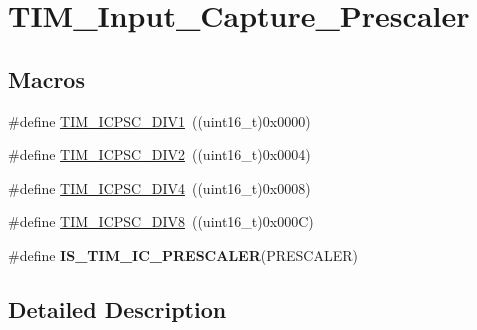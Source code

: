 \hypertarget{group___t_i_m___input___capture___prescaler}{\section{T\-I\-M\-\_\-\-Input\-\_\-\-Capture\-\_\-\-Prescaler}
\label{group___t_i_m___input___capture___prescaler}
}
\subsection*{Macros}
\begin{DoxyCompactItemize}
\item 
\#define \hyperlink{group___t_i_m___input___capture___prescaler_ga8acb44abe3147d883685c1f9f1ce410e}{T\-I\-M\-\_\-\-I\-C\-P\-S\-C\-\_\-\-D\-I\-V1}~((uint16\-\_\-t)0x0000)
\item 
\#define \hyperlink{group___t_i_m___input___capture___prescaler_ga1d8a7b66add914e2ddd910d2d700978f}{T\-I\-M\-\_\-\-I\-C\-P\-S\-C\-\_\-\-D\-I\-V2}~((uint16\-\_\-t)0x0004)
\item 
\#define \hyperlink{group___t_i_m___input___capture___prescaler_gaf5a675046430fa0f0c95b0dac612828f}{T\-I\-M\-\_\-\-I\-C\-P\-S\-C\-\_\-\-D\-I\-V4}~((uint16\-\_\-t)0x0008)
\item 
\#define \hyperlink{group___t_i_m___input___capture___prescaler_ga5086cb03c89a5c67b199d20b605f00cb}{T\-I\-M\-\_\-\-I\-C\-P\-S\-C\-\_\-\-D\-I\-V8}~((uint16\-\_\-t)0x000\-C)
\item 
\#define {\bfseries I\-S\-\_\-\-T\-I\-M\-\_\-\-I\-C\-\_\-\-P\-R\-E\-S\-C\-A\-L\-E\-R}(P\-R\-E\-S\-C\-A\-L\-E\-R)
\end{DoxyCompactItemize}


\subsection{Detailed Description}


